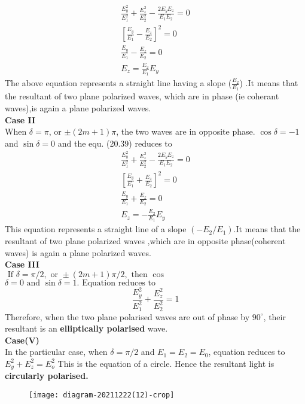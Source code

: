 $$
\begin{gathered}
\frac{E_{y}^{2}}{E_{1}^{2}}+\frac{E_{z}^{2}}{E_{2}^{2}}-\frac{2 E_{y} E_{z}}{E_{1} E_{2}}=0 \\
{\left[\frac{E_{y}}{E_{1}}-\frac{E_{z}}{E_{2}}\right]^{2}=0} \\
\frac{E_{y}}{E_{1}}-\frac{E_{z}}{E_{2}}=0 \\
E_{z}=\frac{E_{2}}{E_{1}} E_{y}
\end{gathered}
$$
 The above equation represents a straight line having a slope ($\frac{E_2}{E_1}$) .It means that the resultant of two plane polarized waves, which are in phase (ie coherant waves),is again a plane polarized waves.\\
 \textbf{Case II} \\
 When $\delta=\pi$, or $\pm(2 m+1) \pi$, the two waves are in opposite phase. $\cos \delta=-1$ and $\sin \delta=0$ and the equ. (20.39) reduces to
 $$
 \begin{gathered}
 \frac{E_{y}^{2}}{E_{1}^{2}}+\frac{E_{z}^{2}}{E_{2}^{2}}-\frac{2 E_{y} E_{z}}{E_{1} E_{2}}=0 \\
 {\left[\frac{E_{y}}{E_{1}}+\frac{E_{z}}{E_{2}}\right]^{2}=0} \\
 \frac{E_{y}}{E_{1}}+\frac{E_{z}}{E_{2}}=0 \\
 E_{z}=-\frac{E_{2}}{E_{1}} E_{y}
 \end{gathered}
 $$
 This equation represents a straight line of a slope $\left(-E_{2} / E_{1}\right)$.It means that the resultant of two plane polarized waves ,which are in opposite phase(coherent waves) is again a plane polarized waves.\\
 \textbf{Case III}\\
 $\text { If } \delta=\pi / 2, \text { or } \pm(2 m+1) \pi / 2, \text { then } \cos $$\delta=0 \text { and } \sin \delta=1 . \text { Equation} \text { reduces to }$
 $$\frac{E_{y}^{2}}{E_{1}^{2}}+\frac{E_{z}^{2}}{E_{2}^{2}}=1$$
  Therefore, when the two plane polarised waves are out of phase by $90^{\circ}$, their resultant is an \textbf{elliptically polarised} wave.\\
  \textbf{Case(V)}\\
   In the particular case, when $\delta=\pi / 2$ and $E_{1}=E_{2}=E_{0}$, equation reduces to $E_{y}^{2}+E_{z}^{2}=E_{o}^{2}$
  This is the equation of a circle. Hence the resultant light is \textbf{circularly polarised.
  }
 
 \begin{figure}[H]
 	\centering
 	\texttt{[image: diagram-20211222(12)-crop]}
 	\caption{}
 	\label{}
 \end{figure}
 
